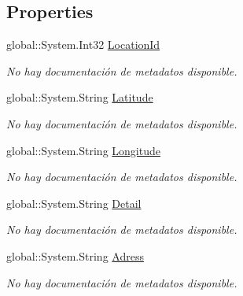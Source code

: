 \subsection*{Properties}
\begin{DoxyCompactItemize}
\item 
global\-::\-System.\-Int32 \hyperlink{class_game_memory_1_1_locations_a701a32d74857333fff435f05e2ce9f6a}{Location\-Id}
\begin{DoxyCompactList}\small\item\em No hay documentación de metadatos disponible. \end{DoxyCompactList}\item 
global\-::\-System.\-String \hyperlink{class_game_memory_1_1_locations_a9bfc421c1b405e1abc46caa06a9f32df}{Latitude}
\begin{DoxyCompactList}\small\item\em No hay documentación de metadatos disponible. \end{DoxyCompactList}\item 
global\-::\-System.\-String \hyperlink{class_game_memory_1_1_locations_a1e157ff8446d76da3fff6479e73d910c}{Longitude}
\begin{DoxyCompactList}\small\item\em No hay documentación de metadatos disponible. \end{DoxyCompactList}\item 
global\-::\-System.\-String \hyperlink{class_game_memory_1_1_locations_a6c2715b80d375ead97d530deb4f20f87}{Detail}
\begin{DoxyCompactList}\small\item\em No hay documentación de metadatos disponible. \end{DoxyCompactList}\item 
global\-::\-System.\-String \hyperlink{class_game_memory_1_1_locations_a03b9430eb5232aa3555f117bc4b2bdca}{Adress}
\begin{DoxyCompactList}\small\item\em No hay documentación de metadatos disponible. \end{DoxyCompactList}\item 

\end{DoxyCompactItemize}
